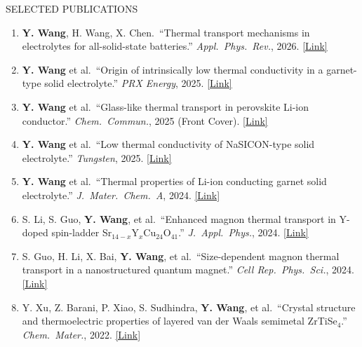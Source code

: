 \documentclass{resume}
\begin{document}

\begin{rSection}{SELECTED PUBLICATIONS}
\begin{enumerate}
\itemsep 0.05em
\item \textbf{Y. Wang}, H. Wang, X. Chen.\ ``Thermal transport mechanisms in electrolytes for all-solid-state batteries.'' \textit{Appl.\ Phys.\ Rev.}, 2026. \href{https://doi.org/10.1063/5.0318328}{[Link]}
\item \textbf{Y. Wang} et al.\ ``Origin of intrinsically low thermal conductivity in a garnet-type solid electrolyte.'' \textit{PRX Energy}, 2025. \href{https://doi.org/10.1103/6wj2-kzhh}{[Link]}
\item \textbf{Y. Wang} et al.\ ``Glass-like thermal transport in perovskite Li-ion conductor.'' \textit{Chem.\ Commun.}, 2025 (Front Cover). \href{https://doi.org/10.1039/D5CC04693A}{[Link]}
\item \textbf{Y. Wang} et al.\ ``Low thermal conductivity of NaSICON-type solid electrolyte.'' \textit{Tungsten}, 2025. \href{https://doi.org/10.1007/s42864-025-00357-6}{[Link]}
\item \textbf{Y. Wang} et al.\ ``Thermal properties of Li-ion conducting garnet solid electrolyte.'' \textit{J.\ Mater.\ Chem.\ A}, 2024. \href{https://doi.org/10.1039/D4TA02264E}{[Link]}
\item S. Li, S. Guo, \textbf{Y. Wang}, et al.\ ``Enhanced magnon thermal transport in Y-doped spin-ladder Sr$_{14-x}$Y$_x$Cu$_{24}$O$_{41}$.'' \textit{J.\ Appl.\ Phys.}, 2024. \href{https://doi.org/10.1063/5.0214897}{[Link]}
\item S. Guo, H. Li, X. Bai, \textbf{Y. Wang}, et al.\ ``Size-dependent magnon thermal transport in a nanostructured quantum magnet.'' \textit{Cell Rep.\ Phys.\ Sci.}, 2024. \href{https://doi.org/10.1016/j.xcrp.2024.101879}{[Link]}
\item Y. Xu, Z. Barani, P. Xiao, S. Sudhindra, \textbf{Y. Wang}, et al.\ ``Crystal structure and thermoelectric properties of layered van der Waals semimetal ZrTiSe$_4$.'' \textit{Chem.\ Mater.}, 2022. \href{https://doi.org/10.1021/acs.chemmater.2c02155}{[Link]}
\end{enumerate}
\end{rSection}
\end{document}
